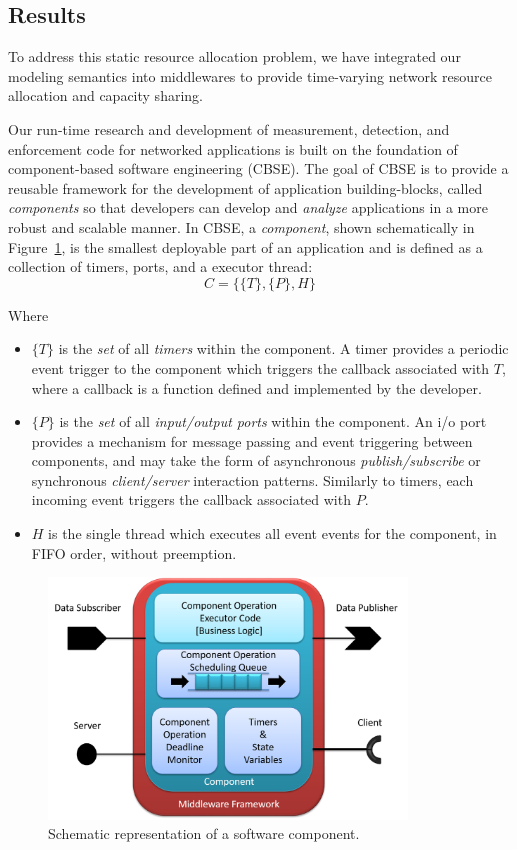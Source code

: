 \subsection{Results}
To address this static resource allocation problem, we have integrated
our modeling semantics into middlewares to provide time-varying
network resource allocation and capacity sharing.

Our run-time research and development of measurement, detection, and
enforcement code for networked applications is built on the foundation
of component-based software engineering (CBSE).  The goal of CBSE is
to provide a reusable framework for the development of application
building-blocks, called \emph{components} so that developers can develop
and \emph{analyze} applications in a more robust and scalable manner.  In
CBSE, a \emph{component}, shown schematically in
Figure~\ref{fig:component}, is the smallest deployable part of an
application and is defined as a collection of timers, ports, and a
executor thread:
\begin{equation}
  C = \{\{T\},\{P\},H\}
\end{equation}

Where

\begin{itemize}
\item $\{T\}$ is the \emph{set} of all \emph{timers} within the component.  A
  timer provides a periodic event trigger to the component which
  triggers the callback associated with $T$, where a callback is a
  function defined and implemented by the developer.  
\item $\{P\}$ is the \emph{set} of all \emph{input/output ports} within the
  component.  An i/o port provides a mechanism for message passing and
  event triggering between components, and may take the form of
  asynchronous \emph{publish/subscribe} or synchronous \emph{client/server}
  interaction patterns.  Similarly to timers, each incoming event
  triggers the callback associated with $P$.
\item $H$ is the single thread which executes all event events for
  the component, in FIFO order, without preemption.  
\end{itemize}

\begin{figure}[ht!]
  \centering
  \includegraphics[width=0.85\textwidth]{figs/ros_component.png}
  \caption{Schematic representation of a software component.}
  \label{fig:component}
\end{figure}

